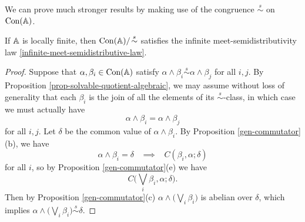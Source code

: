 \begin{appendices}
We can prove much stronger results by making use of the congruence $\stackrel{s}{\sim}$ on $\operatorname{Con}(\mathbb{A})$.

\begin{thm} If $\mathbb{A}$ is locally finite, then $\operatorname{Con}(\mathbb{A})/\!\stackrel{s}{\sim}$ satisfies the infinite meet-semidistributivity law \eqref{infinite-meet-semidistributive-law}.
\end{thm}
\begin{proof} Suppose that $\alpha, \beta_i \in \operatorname{Con}(\mathbb{A})$ satisfy $\alpha \wedge \beta_i \stackrel{s}{\sim} \alpha \wedge \beta_j$ for all $i,j$. By Proposition \ref{prop-solvable-quotient-algebraic}, we may assume without loss of generality that each $\beta_i$ is the join of all the elements of its $\stackrel{s}{\sim}$-class, in which case we must actually have
\[
\alpha \wedge \beta_i = \alpha \wedge \beta_j
\]
for all $i,j$. Let $\delta$ be the common value of $\alpha \wedge \beta_i$. By Proposition \ref{gen-commutator}(b), we have
\[
\alpha \wedge \beta_i = \delta \;\;\; \implies \;\;\; C(\beta_i, \alpha; \delta)
\]
for all $i$, so by Proposition \ref{gen-commutator}(e) we have
\[
C\big(\bigvee_i \beta_i, \alpha; \delta\big).
\]
Then by Proposition \ref{gen-commutator}(c) $\alpha \wedge \big(\bigvee_i \beta_i\big)$ is abelian over $\delta$, which implies $\alpha \wedge \big(\bigvee_i \beta_i\big) \stackrel{s}{\sim} \delta$.
\begin{comment}
By Proposition \ref{prop-solvable-quotient-algebraic}, $\Con(\bA)/\!\stackrel{s}{\sim}$ is an algebraic lattice, so we can apply Proposition \ref{prop-infinite-semidistributive-algebraic} to see that $\Con(\bA)/\!\stackrel{s}{\sim}$ satisfies \eqref{infinite-meet-semidistributive-law} iff it is meet-semidistributive.

Suppose for the sake of contradiction that there are $\alpha, \beta, \gamma \in \Con(\bA)$ such that $\alpha \wedge \beta \stackrel{s}{\sim} \alpha \wedge \gamma$ but
\[
\alpha \wedge (\beta \vee \gamma) \not\stackrel{s}{\sim} \alpha \wedge \beta.
\]
Then by the definition of $\stackrel{s}{\sim}$ there is some pair $(a,b) \in \Sn_2(\bA)$ which is contained in $\alpha \wedge (\beta \vee \gamma)$, but which is not contained in $\alpha \wedge \beta$. Since $(a,b) \in \beta \vee \gamma$, there is some $k$ such that $(a,b) \in (\beta \circ \gamma)^{\circ k}$, so there is a finitely generated subalgebra $\bB$ of $\bA$ which contains $a,b$ and the elements along some $\beta,\gamma$ path from $a$ to $b$ such that
\[
(a,b) \in \alpha|_\bB \wedge (\beta|_\bB \vee \gamma|_\bB).
\]
By ensuring that $\bB$ contains the constants needed to define a binary polynomial $s$ such that $(\{a,b\},s)$ is a semilattice, we can also ensure that $(a,b) \in \Sn_2(\bB)$, so
\[
\alpha|_\bB \wedge (\beta|_\bB \vee \gamma|_\bB) \not\stackrel{s}{\sim} \alpha|_\bB \wedge \beta|_\bB.
\]
Thus we may assume without loss of generality that $\bA$ is finite.
\end{comment}
\end{proof}


\end{appendices}
